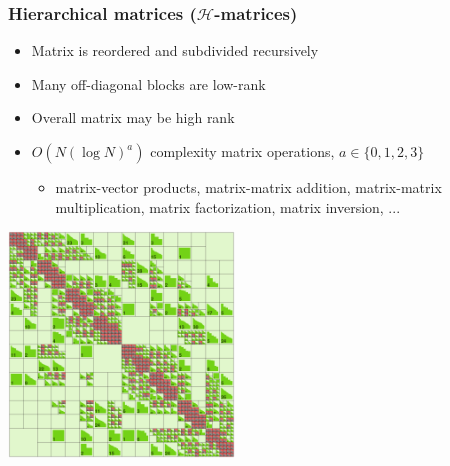 \documentclass[10pt,final,xcolor=dvipsnames]{beamer}
\begin{document}


\begin{frame}
	\frametitle{Hierarchical matrices ($\mathcal{H}$-matrices)}
	\begin{itemize}
		\item Matrix is reordered and subdivided recursively
		\item Many off-diagonal blocks are low-rank
		\item Overall matrix may be high rank
		\item $O(N \left(\log N\right)^a)$ complexity matrix operations, $a \in \{0,1,2,3\}$
		\begin{itemize}
			\item matrix-vector products, matrix-matrix addition, matrix-matrix multiplication, matrix factorization, matrix inversion, ...
		\end{itemize}
	\end{itemize}
	\begin{center}
		\includegraphics[width=0.45\textwidth]{heat_inverse_problem_Hfull_hmatrix.eps}
	\end{center}
\end{frame}
\end{document}
